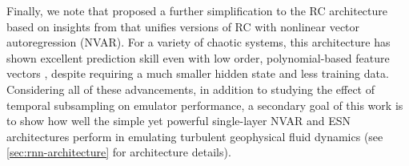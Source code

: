 Finally, we note that \citet{gauthier_next_2021} proposed a further
simplification to the RC architecture based on insights from
\citet{bollt_explaining_2021} that unifies versions of RC with nonlinear vector autoregression (NVAR).
For a variety of chaotic systems, this architecture has shown excellent prediction skill
even with low order, polynomial-based feature vectors
\citep{chen_next_2022,barbosa_learning_2022,gauthier_next_2021}, despite requiring a much
smaller hidden state and less training data.
Considering all of these advancements, in addition to studying the effect of temporal subsampling on emulator performance, a secondary goal of this work is to show how well the simple yet powerful single-layer NVAR and ESN architectures perform in emulating turbulent geophysical fluid dynamics (see \cref{sec:rnn-architecture} for architecture
details).

